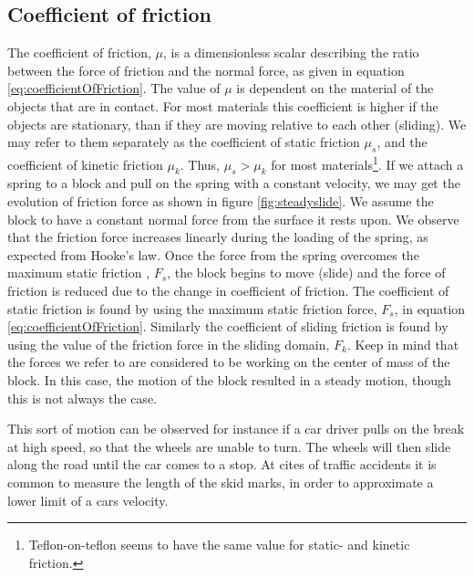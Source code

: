 \documentclass[twoside,english]{uiofysmaster}
\begin{document}
\subsection{Coefficient of friction}
The coefficient of friction, $\mu$, is a dimensionless scalar describing the ratio between the force of friction and the normal force, as given in equation \eqref{eq:coefficientOfFriction}.
The value of $\mu$ is dependent on the material of the objects that are in contact. 
For most materials this coefficient is higher if the objects are stationary, than if they are moving relative to each other (sliding).
We may refer to them separately as the coefficient of static friction $\mu_s$, and the coefficient of kinetic friction $\mu_k$.
Thus, $\mu_s>\mu_ k$ for most materials\footnote{Teflon-on-teflon seems to have the same value for static- and kinetic friction.}.
If we attach a spring to a block and pull on the spring with a constant velocity, we may get the evolution of friction force as shown in figure \ref{fig:steadyslide}.
We assume the block to have a constant normal force from the surface it rests upon. 
We observe that the friction force increases linearly during the loading of the spring, as expected from Hooke's law. 
Once the force from the spring overcomes the maximum static friction , $F_s$, the block begins to move (slide) and the force of friction is reduced due to the change in coefficient of friction. 
The coefficient of static friction is found by using the maximum static friction force, $F_s$, in equation \eqref{eq:coefficientOfFriction}. 
Similarly the coefficient of sliding friction is found by using the value of the friction force in the sliding domain, $F_k$.
Keep in mind that the forces we refer to are considered to be working on the center of mass of the block. 
In this case, the motion of the block resulted in a steady motion, though this is not always the case.

This sort of motion can be observed for instance if a car driver pulls on the break at high speed, so that the wheels are unable to turn.
The wheels will then slide along the road until the car comes to a stop. 
At cites of traffic accidents it is common to measure the length of the skid marks, in order to approximate a lower limit of a cars velocity. 
\end{document}
